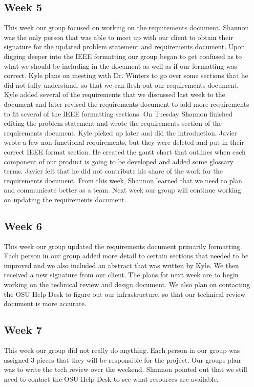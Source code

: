 \documentclass[letterpaper,10pt,serif, draftclsnofoot,onecolumn, compsoc, titlepage]{IEEEtran}
\begin{document}
\subsection{Week 5}
This week our group focused on working on the requirements document. Shannon was the only person that was able to meet up with our client to obtain their signature for the updated problem statement and requirements document. Upon digging deeper into the IEEE formatting our group began to get confused as to what we should be including in the document as well as if our formatting was correct. Kyle plans on meeting with Dr. Winters to go over some sections that he did not fully understand, so that we can flesh out our requirements document. Kyle added several of the requirements that we discussed last week to the document and later revised the requirements document to add more requirements to fit several of the IEEE formatting sections. On Tuesday Shannon finished editing the problem statement and wrote the requirements section of the requirements document. Kyle picked up later and did the introduction. Javier wrote a few non-functional requirements, but they were deleted and put in their correct IEEE format section. He created the gantt chart that outlines when each component of our product is going to be developed and added some glossary terms. Javier felt that he did not contribute his share of the work for the requirements document.  From this week, Shannon learned that we need to plan and communicate better as a team. Next week our group will continue working on updating the requirements document. 

\subsection{Week 6}
This week our group updated the requirements document primarily formatting. Each person in our group added more detail to certain sections that needed to be improved and we also included an abstract that was written by Kyle. We then received a new signature from our client. The plans for next week are to begin working on the technical review and design document. We also plan on contacting the OSU Help Desk to figure out our infrastructure, so that our technical review document is more accurate. 

\subsection{Week 7}
This week our group did not really do anything. Each person in our group was assigned 3 pieces that they will be responsible for the project. Our groups plan was to write the tech review over the weekend. Shannon pointed out that we still need to contact the OSU Help Desk to see what resources are available. 
\end{document}

